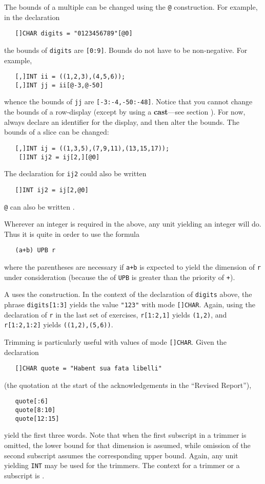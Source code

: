 The bounds of a multiple can be changed using the \verb|@|
construction. For example, in the declaration
\begin{verbatim}
   []CHAR digits = "0123456789"[@0]
\end{verbatim}
\noindent
the bounds of \verb|digits| are \verb|[0:9]|. Bounds do not have to
be non-negative.  For example,
\begin{verbatim}
   [,]INT ii = ((1,2,3),(4,5,6));
   [,]INT jj = ii[@-3,@-50]
\end{verbatim}
\noindent
whence the bounds of \verb|jj| are \verb|[-3:-4,-50:-48]|.  Notice
that you cannot change the bounds of a row-display (except by using a
\textbf{cast}---see section ). For now, always
declare an identifier for the display, and then alter the bounds.
The bounds of a slice can be changed:
\begin{verbatim}
   [,]INT ij = ((1,3,5),(7,9,11),(13,15,17));
    []INT ij2 = ij[2,][@0]
\end{verbatim}
\noindent
The declaration for \verb|ij2| could also be written
\begin{verbatim}
   []INT ij2 = ij[2,@0]
\end{verbatim}
\noindent
\verb|@| can also be written .

Wherever an integer is required in the above, any unit yielding an
integer will do. Thus it is quite in order to use the formula
\begin{verbatim}
   (a+b) UPB r
\end{verbatim}
\noindent
where the parentheses are necessary if \verb|a+b| is expected to
yield the dimension of \verb|r| under consideration (because the
 of \verb|UPB| is greater than the priority
of \verb|+|).

A  uses the \ixtt{:} construction.  In the context of
the declaration of \verb|digits| above, the phrase \verb|digits[1:3]|
yields the value \verb|"123"| with mode \verb|[]CHAR|.  Again, using
the declaration of \verb|r| in the last set of exercises,
\verb|r[1:2,1]| yields \verb|(1,2)|, and \verb|r[1:2,1:2]| yields
\verb|((1,2),(5,6))|.

Trimming is particularly useful with values of mode \verb|[]CHAR|.
Given the declaration
\begin{verbatim}
   []CHAR quote = "Habent sua fata libelli"
\end{verbatim}
\noindent
(the quotation at the start of the acknowledgements in the ``Revised
Report''),
\begin{verbatim}
   quote[:6]
   quote[8:10]
   quote[12:15]
\end{verbatim}
\noindent
yield the first three words. Note that when the first subscript in a
trimmer is omitted, the lower bound for that dimension is assumed,
while omission of the second subscript assumes the corresponding
upper bound. Again, any unit yielding \verb|INT| may be used for the
trimmers. The context for a trimmer or a subscript is
.

